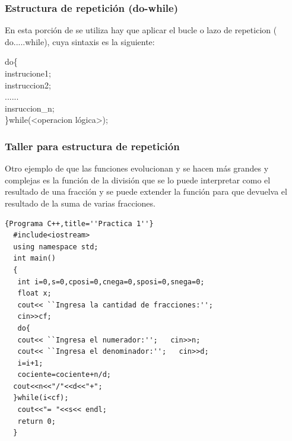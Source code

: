 \documentclass[a4paper,12pt,spanish]{article}
\begin{document}
\newpage
\restoregeometry

\subsubsection{Estructura de repetición (do-while)
}


En esta porción de se utiliza hay que aplicar el  bucle o lazo de repeticion ( do{.....}while), cuya sintaxis es la siguiente:

    \begin{tcolorbox}[title=''Sintaxis de un do{...}while(..);'']
      do\{\\
        instrucione1;\\
        instruccion2;\\
        ......\\
        insruccion\_n;\\
       \}while(<operacion lógica>);
    \end{tcolorbox}

    \newpage
\subsubsection{Taller para estructura de repetición}

     Otro ejemplo de que las funciones evolucionan y se hacen más grandes y complejas es la función de la división que se lo puede interpretar como el resultado de una fracción y se puede extender la función para que devuelva el resultado de la suma de varias fracciones.

    \begin{lstlisting}[frame=trBL,caption={\textbf{sumafracciones()}}]{Programa C++,title=''Practica 1''}
  #include<iostream>
  using namespace std;
  int main()
  {
   int i=0,s=0,cposi=0,cnega=0,sposi=0,snega=0;
   float x;
   cout<< ``Ingresa la cantidad de fracciones:'';
   cin>>cf;
   do{
   cout<< ``Ingresa el numerador:'';   cin>>n;
   cout<< ``Ingresa el denominador:'';   cin>>d;
   i=i+1;
   cociente=cociente+n/d;
  cout<<n<<"/"<<d<<"+";
  }while(i<cf);
   cout<<"= "<<s<< endl;
   return 0;
  }
\end{lstlisting}
\end{document}
